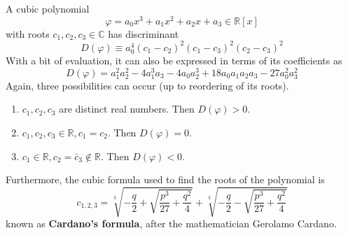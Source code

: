   \begin{lemma}
    A cubic polynomial 
    \begin{equation}
      \varphi = a_0 x^3 + a_1 x^2 + a_2 x + a_3 \in \mathbb{R}[x]
    \end{equation}
    with roots $c_1, c_2, c_3 \in \mathbb{C}$ has discriminant
    \begin{equation}
      D(\varphi) \equiv a_0^4 (c_1 - c_2)^2 (c_1 - c_3)^2 (c_2 - c_3)^2
    \end{equation}
    With a bit of evaluation, it can also be expressed in terms of its coefficients as
    \begin{equation}
      D(\varphi) = a_1^2 a_2^2 - 4a_1^3 a_3 - 4a_0 a_2^3 + 18 a_0 a_1 a_2 a_3 - 27 a_0^2 a_3^2
    \end{equation}
    Again, three possibilities can occur (up to reordering of its roots). 
    \begin{enumerate}
        \item $c_1, c_2, c_3$ are distinct real numbers. Then $D(\varphi) > 0$. 
        \item $c_1, c_2, c_3 \in \mathbb{R}, c_1 = c_2$. Then $D(\varphi) = 0$. 
        \item $c_1 \in \mathbb{R}, c_2 = \bar{c}_3 \not\in \mathbb{R}$. Then $D(\varphi) < 0$. 
    \end{enumerate}
    Furthermore, the cubic formula used to find the roots of the polynomial is 
    \begin{equation}
      c_{1, 2, 3} = \sqrt[3]{-\frac{q}{2} + \sqrt{\frac{p^3}{27} + \frac{q^2}{4}}} + \sqrt[3]{-\frac{q}{2} - \sqrt{\frac{p^3}{27} + \frac{q^2}{4}}}
    \end{equation}
    known as \textbf{Cardano's formula}, after the mathematician Gerolamo Cardano. 
  \end{lemma}




